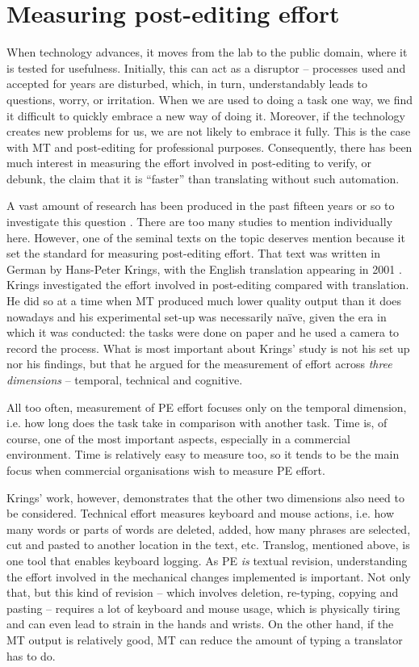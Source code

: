 \documentclass[output=paper,colorlinks,citecolor=brown]{langscibook}
\begin{document}
\section{Measuring post-editing effort}

When technology advances, it moves from the lab to the public domain, where it is tested for usefulness. Initially, this can act as a disruptor – processes used and accepted for years are disturbed, which, in turn, understandably leads to questions, worry, or irritation. When we are used to doing a task one way, we find it difficult to quickly embrace a new way of doing it. Moreover, if the technology creates new problems for us, we are not likely to embrace it fully. This is the case with MT and post-editing for professional purposes. Consequently, there has been much interest in measuring the effort involved in post-editing to verify, or debunk, the claim that it is “faster” than translating without such automation.

A vast amount of research has been produced in the past fifteen years or so to investigate this question  \citep{Koponen2016}. There are too many studies to mention individually here. However, one of the seminal texts on the topic deserves mention because it set the standard for measuring post-editing effort. That text was written in German by Hans-Peter Krings, with the English translation appearing in 2001 \citep{Krings2001}. Krings investigated the effort involved in post-editing compared with translation. He did so at a time when MT produced much lower quality output than it does nowadays and his experimental set-up was necessarily naïve, given the era in which it was conducted: the tasks were done on paper and he used a camera to record the process. What is most important about Krings’ study is not his set up nor his findings, but that he argued for the measurement of effort across \textit{three dimensions} – temporal, technical and cognitive. 

All too often, measurement of PE effort focuses only on the temporal dimension, i.e. how long does the task take in comparison with another task. Time is, of course, one of the most important aspects, especially in a commercial environment. Time is relatively easy to measure too, so it tends to be the main focus when commercial organisations wish to measure PE effort. 

Krings’ work, however, demonstrates that the other two dimensions also need to be considered. Technical effort measures keyboard and mouse actions, i.e. how many words or parts of words are deleted, added, how many phrases are selected, cut and pasted to another location in the text, etc. Translog, mentioned above, is one tool that enables keyboard logging. As PE \textit{is} textual revision, understanding the effort involved in the mechanical changes implemented is important. Not only that, but this kind of revision -- which involves deletion, re-typing, copying and pasting -- requires a lot of keyboard and mouse usage, which is physically tiring and can even lead to strain in the hands and wrists. On the other hand, if the MT output is relatively good, MT can reduce the amount of typing a translator has to do. 
\end{document}
